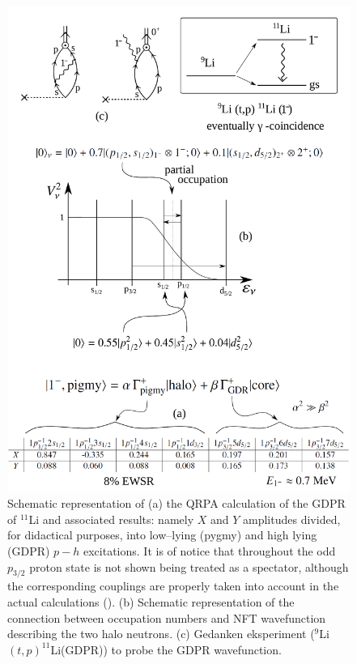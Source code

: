 \begin{subappendices}
\begin{figure}
\centerline{\includegraphics*[width=14cm,angle=0]{nutshell/figs/fig3C1}}
\caption{Schematic representation of (a) the QRPA calculation of the GDPR of $^{11}$Li and associated results: namely $X$ and $Y$ amplitudes divided, for didactical purposes, into low--lying (pygmy) and high lying (GDPR) $p-h$ excitations. It is of notice that throughout the odd $p_{3/2}$ proton state is not shown being treated as a spectator, although the corresponding couplings are properly taken  into account in the actual calculations (\cite{Barranco:01}). (b) Schematic representation of the connection between occupation numbers and NFT wavefunction describing the two halo neutrons. (c) Gedanken eksperiment ($^9$Li$(t,p)^{11}$Li(GDPR)) to probe the GDPR wavefunction. }\label{fig3C1}
\end{figure}

\end{subappendices}

